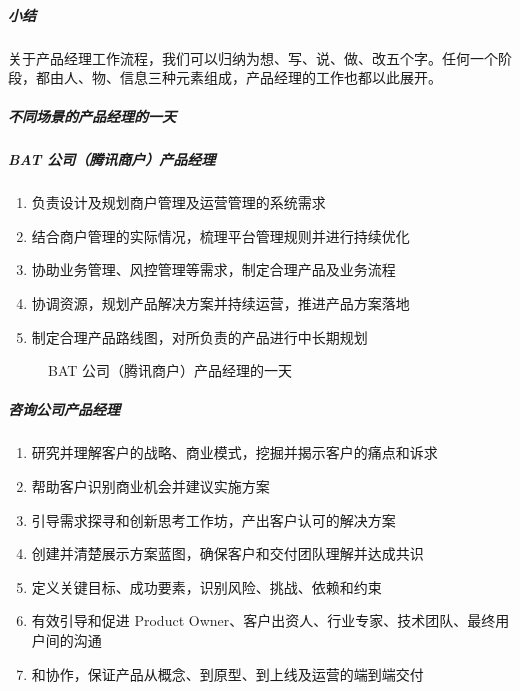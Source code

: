 \documentclass[letterpaper,10pt,english]{sphinxmanual}
\begin{document}
\subparagraph{小结}
\label{\detokenize{chapter_introduction/1Day:id4}}
关于产品经理工作流程，我们可以归纳为想、写、说、做、改五个字。任何一个阶段，都由人、物、信息三种元素组成，产品经理的工作也都以此展开。


\subparagraph{不同场景的产品经理的一天}
\label{\detokenize{chapter_introduction/1Day:id5}}

\subparagraph{BAT 公司（腾讯商户）产品经理}
\label{\detokenize{chapter_introduction/1Day:bat}}\begin{enumerate}
%
\item {} 
负责设计及规划商户管理及运营管理的系统需求

\item {} 
结合商户管理的实际情况，梳理平台管理规则并进行持续优化

\item {} 
协助业务管理、风控管理等需求，制定合理产品及业务流程

\item {} 
协调资源，规划产品解决方案并持续运营，推进产品方案落地

\item {} 
制定合理产品路线图，对所负责的产品进行中长期规划

\end{enumerate}

\begin{figure}[H]
\centering
\capstart

\noindent{}
\caption{BAT 公司（腾讯商户）产品经理的一天}\label{\detokenize{chapter_introduction/1Day:id9}}\end{figure}


\subparagraph{咨询公司产品经理}
\label{\detokenize{chapter_introduction/1Day:id6}}\begin{enumerate}
%
\item {} 
研究并理解客户的战略、商业模式，挖掘并揭示客户的痛点和诉求

\item {} 
帮助客户识别商业机会并建议实施方案

\item {} 
引导需求探寻和创新思考工作坊，产出客户认可的解决方案

\item {} 
创建并清楚展示方案蓝图，确保客户和交付团队理解并达成共识

\item {} 
定义关键目标、成功要素，识别风险、挑战、依赖和约束

\item {} 
有效引导和促进 Product
Owner、客户出资人、行业专家、技术团队、最终用户间的沟通

\item {} 
和协作，保证产品从概念、到原型、到上线及运营的端到端交付

\end{enumerate}
\end{document}
